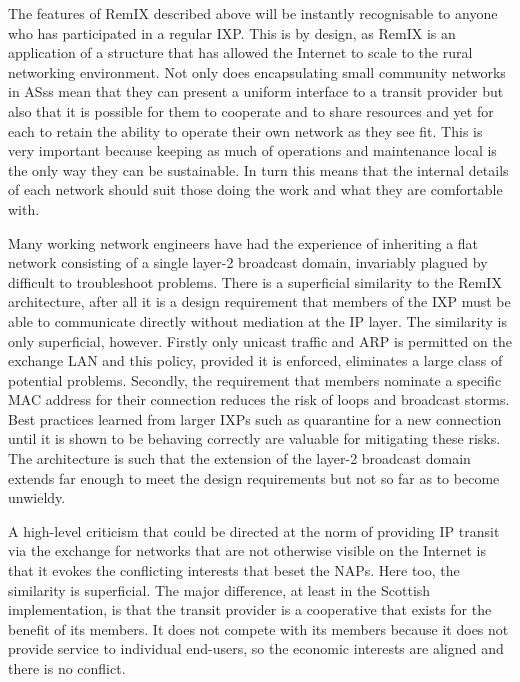 The features of RemIX described above will be instantly recognisable
to anyone who has participated in a regular \ac{IXP}. This is by
design, as RemIX is an application of a structure that has allowed the
Internet to scale to the rural networking environment. Not only does
encapsulating small community networks in \acp{AS}s mean that they can
present a uniform interface to a transit provider but also that it is
possible for them to cooperate and to share resources and yet for each
to retain the ability to operate their own network as they see
fit. This is very important because keeping as much of operations and
maintenance local is the only way they can be sustainable. In turn
this means that the internal details of each network should suit those
doing the work and what they are comfortable with.

Many working network engineers have had the experience of inheriting a
flat network consisting of a single layer-2 broadcast domain,
invariably plagued by difficult to troubleshoot problems. There is a
superficial similarity to the RemIX architecture, after all it is a
design requirement that members of the \ac{IXP} must be able to
communicate directly without mediation at the IP layer. The similarity
is only superficial, however. Firstly only unicast traffic and
\ac{ARP} is permitted on the exchange \ac{LAN} and this policy,
provided it is enforced, eliminates a large class of potential
problems. Secondly, the requirement that members nominate a specific
\ac{MAC} address for their connection reduces the risk of loops and
broadcast storms. Best practices learned from larger \acp{IXP} such as
quarantine for a new connection until it is shown to be behaving
correctly are valuable for mitigating these risks. The architecture is
such that the extension of the layer-2 broadcast domain extends far
enough to meet the design requirements but not so far as to become
unwieldy.

A high-level criticism that could be directed at the norm of providing
IP transit via the exchange for networks that are not otherwise
visible on the Internet is that it evokes the conflicting interests
that beset the \acp{NAP}. Here too, the similarity is superficial. The
major difference, at least in the Scottish implementation, is that the
transit provider is a cooperative that exists for the benefit of its
members. It does not compete with its members because it does not
provide service to individual end-users, so the economic interests are
aligned and there is no conflict.
